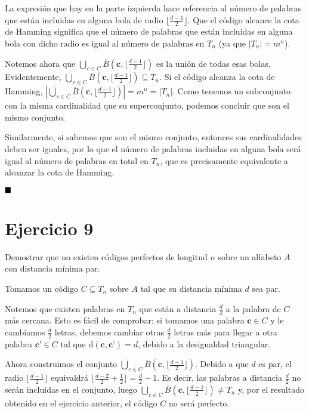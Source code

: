 La expresión que hay en la parte izquierda hace referencia al número de palabras que están incluidas en alguna bola de radio $\lfloor\frac{d-1}{2}\rfloor$. Que el código alcance la cota de Hamming significa que el número de palabras que están incluidas en alguna bola con dicho radio es igual al número de palabras en $T_n$ (ya que $|T_n| = m^n$).

Notemos ahora que $\dot{\bigcup}_{c\in C}\overline{B}(\textbf{c}, \lfloor\frac{d-1}{2}\rfloor)$ es la unión de todas esas bolas. Evidentemente, $\dot{\bigcup}_{c\in C}\overline{B}(\textbf{c}, \lfloor\frac{d-1}{2}\rfloor) \subseteq T_n$. Si el código alcanza la cota de Hamming, $|\dot{\bigcup}_{c\in C}\overline{B}(\textbf{c}, \lfloor\frac{d-1}{2}\rfloor)| = m^n = |T_n|$. Como tenemos un subconjunto con la misma cardinalidad que su superconjunto, podemos concluir que son el mismo conjunto.

Similarmente, si sabemos que son el mismo conjunto, entonces sus cardinalidades deben ser iguales, por lo que el número de palabras incluidas en alguna bola será igual al número de palabras en total en $T_n$, que es precisamente equivalente a alcanzar la cota de Hamming.

$\qed$

\section{Ejercicio 9}

\begin{formulationBox}
	Demostrar que no existen códigos perfectos de longitud $n$ sobre un alfabeto $A$ con distancia mínima par.
\end{formulationBox}

Tomamos un código $C\subseteq T_n$ sobre $A$ tal que su distancia mínima $d$ sea par.

Notemos que existen palabras en $T_n$ que están a distancia $\frac{d}{2}$ a la palabra de $C$ más cercana. Esto es fácil de comprobar: si tomamos una palabra $\textbf{c}\in C$ y le cambiamos $\frac{d}{2}$ letras, debemos cambiar otras $\frac{d}{2}$ letras más para llegar a otra palabra $\textbf{c'}\in C$ tal que $\mathrm{d}(\textbf{c}, \textbf{c'})=d$, debido a la desigualdad triangular.

Ahora construimos el conjunto $\dot{\bigcup}_{c\in C}\overline{B}(\textbf{c}, \lfloor\frac{d-1}{2}\rfloor)$. Debido a que $d$ es par, el radio $\lfloor\frac{d-1}{2}\rfloor$ equivaldrá $\lfloor\frac{d-2}{2}+\frac{1}{2}\rfloor = \frac{d}{2}-1$. Es decir, las palabras a distancia $\frac{d}{2}$ no serán incluidas en el conjunto, luego $\dot{\bigcup}_{c\in C}\overline{B}(\textbf{c}, \lfloor\frac{d-1}{2}\rfloor) \neq T_n$ y, por el resultado obtenido en el ejercicio anterior, el código $C$ no será perfecto.
